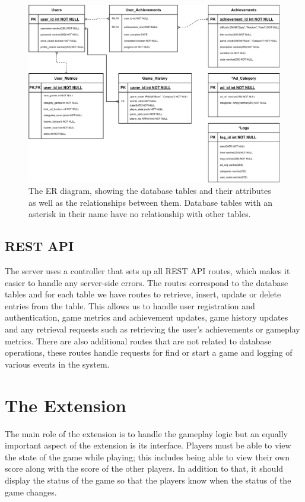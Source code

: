 \documentclass{l4proj}
\begin{document}
\begin{figure}
    \centering
    \includegraphics[width=1\linewidth]{images/ER_diagram.pdf}    

    \caption{The ER diagram, showing the database tables and their attributes as well as the relationships between them. Database tables with an asterisk in their name have no relationship with other tables. }

    \label{fig:ER} 
\end{figure}

\subsection{REST API}
The server uses a controller that sets up all REST API routes, which makes it easier to handle any server-side errors. The routes correspond to the database tables and for each table we have routes to retrieve, insert, update or delete entries from the table. This allows us to handle user registration and authentication, game metrics and achievement updates, game history updates and any retrieval requests such as retrieving the user's achievements or gameplay metrics. There are also additional routes that are not related to database operations, these routes handle requests for find or start a game and logging of various events in the system.

\section{The Extension}
The main role of the extension is to handle the gameplay logic but an equally important aspect of the extension is its interface. Players must be able to view the state of the game while playing; this includes being able to view their own score along with the score of the other players. In addition to that, it should display the status of the game so that the players know when the status of the game changes.
\end{document}
